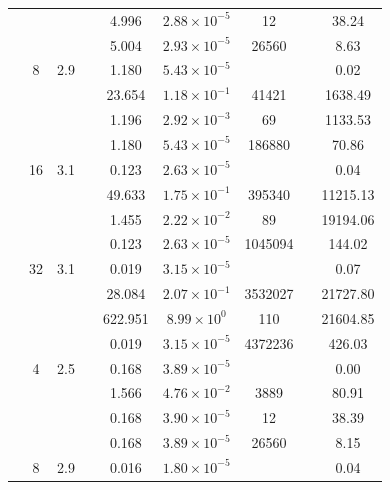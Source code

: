\begin{table}[htbp]
\begin{tabular}{l S[table-format=3.0] S[table-format=4.1] l S[table-format=3.3] S[table-format=1.2e2] S[table-format=6.0] S[table-format=2.0] S[table-format=4.2]}
     &  &  &  & 4.996 & $2.88 \times 10^{-5}$ & 12 & {\text{---}} & 38.24 \\
     &  &  &  & 5.004 & $2.93 \times 10^{-5}$ & 26560 & {\text{---}} & 8.63 \\
     & 8 & 2.9 &  & 1.180 & $5.43 \times 10^{-5}$ & {\text{---}} & {\text{---}} & 0.02 \\
     &  &  &  & 23.654 & $1.18 \times 10^{-1}$ & 41421 & {\text{---}} & 1638.49 \\
     &  &  &  & 1.196 & $2.92 \times 10^{-3}$ & 69 & {\text{---}} & 1133.53 \\
     &  &  &  & 1.180 & $5.43 \times 10^{-5}$ & 186880 & {\text{---}} & 70.86 \\
     & 16 & 3.1 &  & 0.123 & $2.63 \times 10^{-5}$ & {\text{---}} & {\text{---}} & 0.04 \\
     &  &  &  & 49.633 & $1.75 \times 10^{-1}$ & 395340 & {\text{---}} & 11215.13 \\
     &  &  &  & 1.455 & $2.22 \times 10^{-2}$ & 89 & {\text{---}} & 19194.06 \\
     &  &  &  & 0.123 & $2.63 \times 10^{-5}$ & 1045094 & {\text{---}} & 144.02 \\
     & 32 & 3.1 &  & 0.019 & $3.15 \times 10^{-5}$ & {\text{---}} & {\text{---}} & 0.07 \\
     &  &  &  & 28.084 & $2.07 \times 10^{-1}$ & 3532027 & {\text{---}} & 21727.80 \\
     &  &  &  & 622.951 & $8.99 \times 10^{0}$ & 110 & {\text{---}} & 21604.85 \\
     &  &  &  & 0.019 & $3.15 \times 10^{-5}$ & 4372236 & {\text{---}} & 426.03 \\
    \midrule
     & 4 & 2.5 &  & 0.168 & $3.89 \times 10^{-5}$ & {\text{---}} & {\text{---}} & 0.00 \\
     &  &  &  & 1.566 & $4.76 \times 10^{-2}$ & 3889 & {\text{---}} & 80.91 \\
     &  &  &  & 0.168 & $3.90 \times 10^{-5}$ & 12 & {\text{---}} & 38.39 \\
     &  &  &  & 0.168 & $3.89 \times 10^{-5}$ & 26560 & {\text{---}} & 8.15 \\
     & 8 & 2.9 &  & 0.016 & $1.80 \times 10^{-5}$ & {\text{---}} & {\text{---}} & 0.04 \\

\end{tabular}
\end{table}
